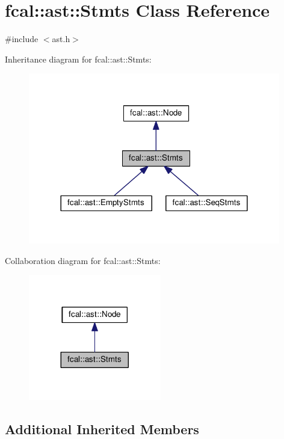 \hypertarget{classfcal_1_1ast_1_1Stmts}{}\section{fcal\+:\+:ast\+:\+:Stmts Class Reference}
\label{classfcal_1_1ast_1_1Stmts}


{\ttfamily \#include $<$ast.\+h$>$}



Inheritance diagram for fcal\+:\+:ast\+:\+:Stmts\+:
\nopagebreak
\begin{figure}[H]
\begin{center}
\leavevmode
\includegraphics[width=312pt]{classfcal_1_1ast_1_1Stmts__inherit__graph}
\end{center}
\end{figure}


Collaboration diagram for fcal\+:\+:ast\+:\+:Stmts\+:
\nopagebreak
\begin{figure}[H]
\begin{center}
\leavevmode
\includegraphics[width=164pt]{classfcal_1_1ast_1_1Stmts__coll__graph}
\end{center}
\end{figure}
\subsection*{Additional Inherited Members}



